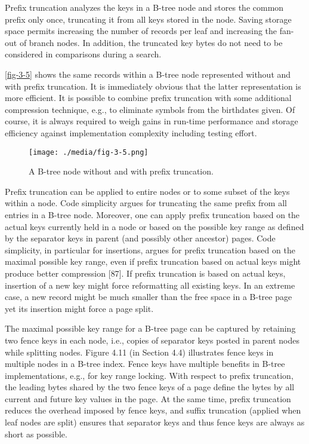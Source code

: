 Prefix truncation analyzes the keys in a B-tree node and stores the
common prefix only once, truncating it from all keys stored in the node.
Saving storage space permits increasing the number of records per leaf
and increasing the fan-out of branch nodes. In addition, the truncated
key bytes do not need to be considered in comparisons during a search.

\autoref{fig-3-5} shows the same records within a B-tree node represented
without and with prefix truncation. It is immediately obvious that the
latter representation is more efficient. It is possible to combine
prefix truncation with some additional compression technique, e.g., to
eliminate symbols from the birthdates given. Of course, it is always
required to weigh gains in run-time performance and storage efficiency
against implementation complexity including testing effort.

\begin{figure}
  \centering
  \texttt{[image: ./media/fig-3-5.png]}

  \caption{A B-tree node without and with prefix truncation.\label{fig-3-5}}
\end{figure}

Prefix truncation can be applied to entire nodes or to some subset of
the keys within a node. Code simplicity argues for truncating the same
prefix from all entries in a B-tree node. Moreover, one can apply prefix
truncation based on the actual keys currently held in a node or based on
the possible key range as defined by the separator keys in parent (and
possibly other ancestor) pages. Code simplicity, in particular for
insertions, argues for prefix truncation based on the maximal possible
key range, even if prefix truncation based on actual keys might produce
better compression {[}87{]}. If prefix truncation is based on actual
keys, insertion of a new key might force reformatting all existing keys.
In an extreme case, a new record might be much smaller than the free
space in a B-tree page yet its insertion might force a page split.

The maximal possible key range for a B-tree page can be captured by
retaining two fence keys in each node, i.e., copies of separator keys
posted in parent nodes while splitting nodes. Figure 4.11 (in Section
4.4) illustrates fence keys in multiple nodes in a B-tree index. Fence
keys have multiple benefits in B-tree implementations, e.g., for key
range locking. With respect to prefix truncation, the leading bytes
shared by the two fence keys of a page define the bytes by all current
and future key values in the page. At the same time, prefix truncation
reduces the overhead imposed by fence keys, and suffix truncation
(applied when leaf nodes are split) ensures that separator keys and thus
fence keys are always as short as possible.

